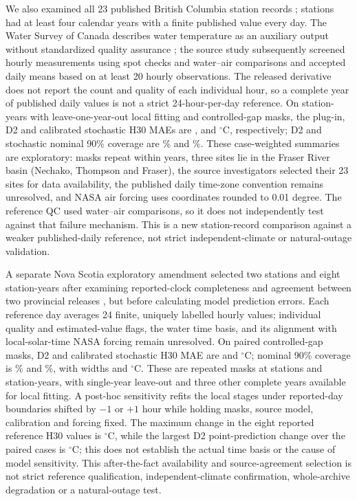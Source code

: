 \documentclass[draft,linenumbers]{agujournal2025}
\begin{document}
We also examined all 23 published British Columbia station records \cite{moore2024bc,callahan2025air2stream}; \BCStations{} stations had at least four calendar years with a finite published value every day. The Water Survey of Canada describes water temperature as an auxiliary output without standardized quality assurance \cite{wsc_temperature_faq}; the source study subsequently screened hourly measurements using spot checks and water--air comparisons and accepted daily means based on at least 20 hourly observations. The released derivative does not report the count and quality of each individual hour, so a complete year of published daily values is not a strict 24-hour-per-day reference. On \BCYears{} station-years with leave-one-year-out local fitting and \BCCases{} controlled-gap masks, the plug-in, D2 and calibrated stochastic H30 MAEs are \BCPluginMAE{}, \BCDTwoMAE{} and \BCStochasticMAE{}$^{\circ}$C, respectively; D2 and stochastic nominal 90\% coverage are \BCDTwoCoverage\% and \BCStochasticCoverage\%. These case-weighted summaries are exploratory: masks repeat within years, three sites lie in the Fraser River basin (Nechako, Thompson and Fraser), the source investigators selected their 23 sites for data availability, the published daily time-zone convention remains unresolved, and NASA air forcing uses coordinates rounded to 0.01 degree. The reference QC used water--air comparisons, so it does not independently test against that failure mechanism. This is a new station-record comparison against a weaker published-daily reference, not strict independent-climate or natural-outage validation.

A separate Nova Scotia exploratory amendment selected two stations and eight station-years after examining reported-clock completeness and agreement between two provincial releases \cite{novascotiawater2026}, but before calculating model prediction errors. Each reference day averages 24 finite, uniquely labelled hourly values; individual quality and estimated-value flags, the water time basis, and its alignment with local-solar-time NASA forcing remain unresolved. On \NSExpCases{} paired controlled-gap masks, D2 and calibrated stochastic H30 MAE are \NSExpDTwoMAE{} and \NSExpClassicMAE{}$^{\circ}$C; nominal 90\% coverage is \NSExpDTwoCover\% and \NSExpClassicCover\%, with widths \NSExpDTwoWidth{} and \NSExpClassicWidth{}$^{\circ}$C. These are repeated masks at \NSExpStations{} stations and \NSExpYears{} station-years, with single-year leave-out and three other complete years available for local fitting. A post-hoc sensitivity refits the local stages under reported-day boundaries shifted by $-1$ or $+1$ hour while holding masks, source model, calibration and forcing fixed. The maximum change in the eight reported reference H30 values is \NSClockHMax{}$^{\circ}$C, while the largest D2 point-prediction change over the \NSClockCases{} paired cases is \NSClockDTwoMax{}$^{\circ}$C; this does not establish the actual time basis or the cause of model sensitivity. This after-the-fact availability and source-agreement selection is not strict reference qualification, independent-climate confirmation, whole-archive degradation or a natural-outage test.
\end{document}
